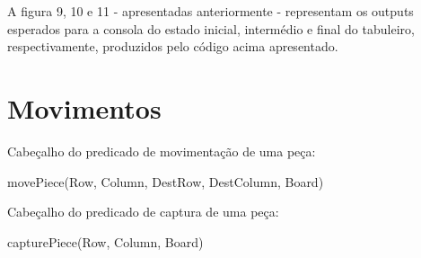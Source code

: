 \documentclass[a4paper]{article}
\begin{document}
\begin{small}
A figura 9, 10 e 11 - apresentadas anteriormente - representam os outputs esperados para a consola do estado inicial, intermédio e final do tabuleiro, respectivamente, produzidos pelo código acima apresentado.
\end{small}

\pagebreak
\section{Movimentos}

Cabeçalho do predicado de movimentação de uma peça:\newline
\begin{small}
movePiece(Row, Column, DestRow, DestColumn, Board)
\end{small}\newline

Cabeçalho do predicado de captura de uma peça:\newline
\begin{small}
capturePiece(Row, Column, Board)
\end{small}
\end{document}
